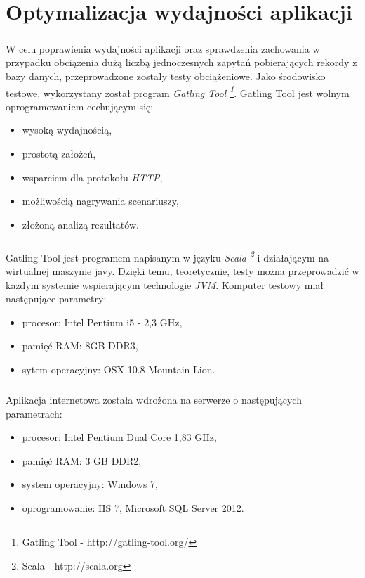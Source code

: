 \chapter{Optymalizacja wydajności aplikacji} %
\label{cha:rekonfigurowalnosc}

\paragraph{} %
\label{par:}
W celu poprawienia wydajności aplikacji oraz sprawdzenia zachowania w przypadku obciążenia dużą liczbą jednoczesnych zapytań pobierających rekordy z bazy danych, przeprowadzone zostały testy obciążeniowe. Jako środowisko testowe, wykorzystany został program \textit{Gatling Tool \footnote{Gatling Tool - http://gatling-tool.org/}}. Gatling Tool jest wolnym oprogramowaniem cechującym się:
\begin{itemize}
 	\item wysoką wydajnością,
 	\item prostotą założeń,
 	\item wsparciem dla protokołu \textit{HTTP},
 	\item możliwością nagrywania scenariuszy,
 	\item złożoną analizą rezultatów.
 \end{itemize} 

\paragraph{} %
\label{par:}
Gatling Tool jest programem napisanym w języku \textit{Scala \footnote{Scala - http://scala.org}} i działającym na wirtualnej maszynie javy. Dzięki temu, teoretycznie, testy można przeprowadzić w każdym systemie wspierającym technologie \textit{JVM}. Komputer testowy miał następujące parametry:
\begin{itemize}
	\item procesor: Intel Pentium i5 - 2,3 GHz,
	\item pamięć RAM: 8GB DDR3,
	\item sytem operacyjny: OSX 10.8 Mountain Lion.
\end{itemize}

\paragraph{} %
 \label{par:}
 Aplikacja internetowa została wdrożona na serwerze o następujących parametrach:
 \begin{itemize}
 	\item procesor: Intel Pentium Dual Core 1,83 GHz,
 	\item pamięć RAM: 3 GB DDR2,
 	\item system operacyjny: Windows 7,
 	\item oprogramowanie: IIS 7, Microsoft SQL Server 2012.
 \end{itemize}



